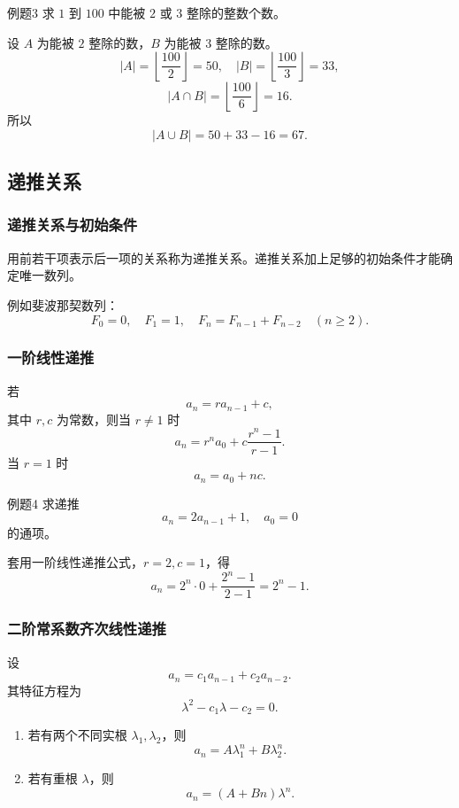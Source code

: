 \begin{question}{例题3}
	求 \(1\) 到 \(100\) 中能被 \(2\) 或 \(3\) 整除的整数个数。
	
	\begin{solution}
	设 \(A\) 为能被 \(2\) 整除的数，\(B\) 为能被 \(3\) 整除的数。
	\[
	|A|=\left\lfloor\frac{100}{2}\right\rfloor=50,\quad
	|B|=\left\lfloor\frac{100}{3}\right\rfloor=33,
	\]
	\[
	|A\cap B|=\left\lfloor\frac{100}{6}\right\rfloor=16.
	\]
	所以
	\[
	|A\cup B|=50+33-16=67.
	\]
	\end{solution}
\end{question}

\subsection{递推关系}

\subsubsection{递推关系与初始条件}

用前若干项表示后一项的关系称为递推关系。递推关系加上足够的初始条件才能确定唯一数列。

例如斐波那契数列：
\[
F_0=0,\quad F_1=1,\quad F_n=F_{n-1}+F_{n-2}\quad(n\ge2).
\]

\subsubsection{一阶线性递推}

若
\[
a_n=ra_{n-1}+c,
\]
其中 \(r,c\) 为常数，则当 \(r\ne1\) 时
\[
a_n=r^na_0+c\frac{r^n-1}{r-1}.
\]
当 \(r=1\) 时
\[
a_n=a_0+nc.
\]

\begin{question}{例题4}
	求递推
	\[
	a_n=2a_{n-1}+1,\quad a_0=0
	\]
	的通项。
	
	\begin{solution}
	套用一阶线性递推公式，\(r=2,c=1\)，得
	\[
	a_n=2^n\cdot0+\frac{2^n-1}{2-1}=2^n-1.
	\]
	\end{solution}
\end{question}

\subsubsection{二阶常系数齐次线性递推}

设
\[
a_n=c_1a_{n-1}+c_2a_{n-2}.
\]
其特征方程为
\[
\lambda^2-c_1\lambda-c_2=0.
\]

\begin{enumerate}
	\item 若有两个不同实根 \(\lambda_1,\lambda_2\)，则
	\[
	a_n=A\lambda_1^n+B\lambda_2^n.
	\]
	\item 若有重根 \(\lambda\)，则
	\[
	a_n=(A+Bn)\lambda^n.
	\]
\end{enumerate}

